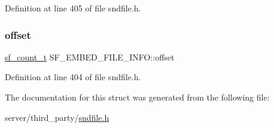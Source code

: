 Definition at line 405 of file sndfile.\+h.

\mbox{\label{struct_s_f___e_m_b_e_d___f_i_l_e___i_n_f_o_a3f9c37d1a474485d613276656e31d591}} 
\subsubsection{\texorpdfstring{offset}{offset}}
{\footnotesize\ttfamily \mbox{\hyperlink{sndfile_8h_af2b12fded74bc949f1f1f392a2af4892}{sf\+\_\+count\+\_\+t}} S\+F\+\_\+\+E\+M\+B\+E\+D\+\_\+\+F\+I\+L\+E\+\_\+\+I\+N\+F\+O\+::offset}



Definition at line 404 of file sndfile.\+h.



The documentation for this struct was generated from the following file\+:\begin{DoxyCompactItemize}
\item 
server/third\+\_\+party/\mbox{\hyperlink{sndfile_8h}{sndfile.\+h}}\end{DoxyCompactItemize}
